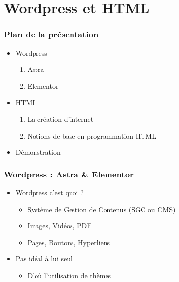 \documentclass{beamer}
\begin{document}
\section{Wordpress et HTML}
\begin{frame}
        \frametitle{Plan de la présentation}
        \begin{itemize}
            \item<2-> Wordpress
                      \begin{enumerate}
                        \item Astra
                        \item Elementor
                      \end{enumerate}
            \item<3-> HTML
                      \begin{enumerate} 
                        \item La création d'internet
                        \item Notions de base en programmation HTML
                      \end{enumerate}
            \item<4-> Démonstration
        \end{itemize}
    \end{frame}
    
    \begin{frame}
      \frametitle{Wordpress : Astra \& Elementor}
      \begin{itemize}
        \item<2-> Wordpress c'est quoi ? 
          \begin{itemize}
            \item Système de Gestion de Contenus (SGC ou CMS)
            \item Images, Vidéos, PDF
            \item Pages, Boutons, Hyperliens
          \end{itemize}
        \item<3-> Pas idéal à lui seul
          \begin{itemize}
            \item D'où l'utilisation de thèmes
          \end{itemize}
      \end{itemize}
    \end{frame}
    
\end{document}
